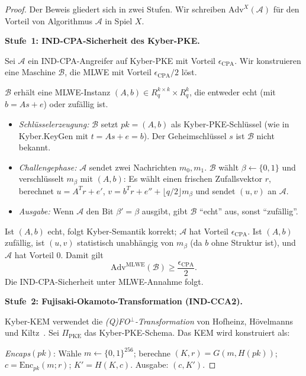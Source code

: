 ﻿\documentclass[a4paper,12pt]{article}
\theoremstyle{definition}
\begin{document}
\begin{proof}
Der Beweis gliedert sich in zwei Stufen. Wir schreiben $\mathrm{Adv}^X(\mathcal{A})$
für den Vorteil von Algorithmus $\mathcal{A}$ in Spiel $X$.

\textbf{Stufe~1: IND-CPA-Sicherheit des Kyber-PKE.}

Sei $\mathcal{A}$ ein IND-CPA-Angreifer auf Kyber-PKE mit Vorteil $\epsilon_\mathrm{CPA}$.
Wir konstruieren eine Maschine $\mathcal{B}$, die MLWE mit Vorteil
$\epsilon_\mathrm{CPA}/2$ löst.

$\mathcal{B}$ erhält eine MLWE-Instanz $(A, b) \in R_q^{k \times k} \times R_q^k$,
die entweder echt (mit $b = As + e$) oder zufällig ist.

\begin{itemize}
\item[(a)] \emph{Schlüsselerzeugung:} $\mathcal{B}$ setzt $pk = (A, b)$ als
  Kyber-PKE-Schlüssel (wie in Kyber.KeyGen mit $t = As + e = b$).
  Der Geheimschlüssel $s$ ist $\mathcal{B}$ nicht bekannt.

\item[(b)] \emph{Challengephase:} $\mathcal{A}$ sendet zwei Nachrichten $m_0, m_1$.
  $\mathcal{B}$ wählt $\beta \leftarrow \{0,1\}$ und verschlüsselt $m_\beta$ mit $(A, b)$:
  Es wählt einen frischen Zufallsvektor $r$, berechnet
  $u = A^T r + e'$, $v = b^T r + e'' + \lfloor q/2 \rfloor m_\beta$
  und sendet $(u, v)$ an $\mathcal{A}$.

\item[(c)] \emph{Ausgabe:} Wenn $\mathcal{A}$ den Bit $\beta' = \beta$ ausgibt,
  gibt $\mathcal{B}$ ``echt'' aus, sonst ``zufällig''.
\end{itemize}

Ist $(A, b)$ echt, folgt Kyber-Semantik korrekt; $\mathcal{A}$ hat Vorteil
$\epsilon_\mathrm{CPA}$. Ist $(A, b)$ zufällig, ist $(u, v)$ statistisch unabhängig
von $m_\beta$ (da $b$ ohne Struktur ist), und $\mathcal{A}$ hat Vorteil $0$.
Damit gilt
\[
  \mathrm{Adv}^\mathrm{MLWE}(\mathcal{B}) \geq \frac{\epsilon_\mathrm{CPA}}{2}.
\]
Die IND-CPA-Sicherheit unter MLWE-Annahme folgt.

\textbf{Stufe~2: Fujisaki-Okamoto-Transformation (IND-CCA2).}

Kyber-KEM verwendet die \emph{(Q)FO$^\bot$-Transformation} von Hofheinz,
Hövelmanns und Kiltz~\cite{FO99}. Sei $\Pi_\mathrm{PKE}$ das Kyber-PKE-Schema.
Das KEM wird konstruiert als:

\emph{Encaps}$(pk)$: Wähle $m \leftarrow \{0,1\}^{256}$; berechne
$(K, r) = G(m, H(pk))$; $c = \mathrm{Enc}_{pk}(m; r)$; $K' = H(K, c)$.
Ausgabe: $(c, K')$.


\end{proof}
\end{document}
